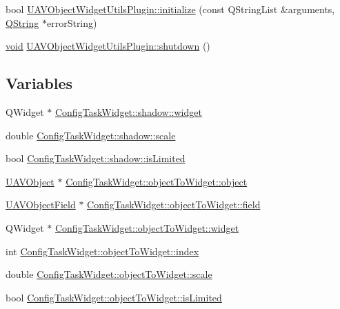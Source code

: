 \begin{DoxyCompactItemize}
\item 
bool \hyperlink{group___u_a_v_object_widget_utils_ga7a913580e5284f9291cab68f3bfed4a3}{\-U\-A\-V\-Object\-Widget\-Utils\-Plugin\-::initialize} (const \-Q\-String\-List \&arguments, \hyperlink{group___u_a_v_objects_plugin_gab9d252f49c333c94a72f97ce3105a32d}{\-Q\-String} $\ast$error\-String)
\item 
\hyperlink{group___u_a_v_objects_plugin_ga444cf2ff3f0ecbe028adce838d373f5c}{void} \hyperlink{group___u_a_v_object_widget_utils_ga672bbb620f7be71610e6adc36d5ca0b9}{\-U\-A\-V\-Object\-Widget\-Utils\-Plugin\-::shutdown} ()
\end{DoxyCompactItemize}
\subsection*{\-Variables}
\begin{DoxyCompactItemize}
\item 
\-Q\-Widget $\ast$ \hyperlink{group___u_a_v_object_widget_utils_ga06fc48ad3875446139f13fbb5b85cdcf}{\-Config\-Task\-Widget\-::shadow\-::widget}
\item 
double \hyperlink{group___u_a_v_object_widget_utils_ga06ad87fdaa5af70d7239dda785c76f76}{\-Config\-Task\-Widget\-::shadow\-::scale}
\item 
bool \hyperlink{group___u_a_v_object_widget_utils_ga712acd84a5850623406835776b1840b4}{\-Config\-Task\-Widget\-::shadow\-::is\-Limited}
\item 
\hyperlink{class_u_a_v_object}{\-U\-A\-V\-Object} $\ast$ \hyperlink{group___u_a_v_object_widget_utils_ga0a7a2adb310cdc6b0301dfad762a4f30}{\-Config\-Task\-Widget\-::object\-To\-Widget\-::object}
\item 
\hyperlink{class_u_a_v_object_field}{\-U\-A\-V\-Object\-Field} $\ast$ \hyperlink{group___u_a_v_object_widget_utils_ga36fdb22e759e0beae23ae99b03becb68}{\-Config\-Task\-Widget\-::object\-To\-Widget\-::field}
\item 
\-Q\-Widget $\ast$ \hyperlink{group___u_a_v_object_widget_utils_gac3c3016bdfda2c16ec8e356dd1a0882d}{\-Config\-Task\-Widget\-::object\-To\-Widget\-::widget}
\item 
int \hyperlink{group___u_a_v_object_widget_utils_ga32127d63078e835a69c50d20ea1a678b}{\-Config\-Task\-Widget\-::object\-To\-Widget\-::index}
\item 
double \hyperlink{group___u_a_v_object_widget_utils_ga7981e8bb575a90d2a1491fd792108efe}{\-Config\-Task\-Widget\-::object\-To\-Widget\-::scale}
\item 
bool \hyperlink{group___u_a_v_object_widget_utils_ga22163ec4275b9b06770d4caead750ee4}{\-Config\-Task\-Widget\-::object\-To\-Widget\-::is\-Limited}

\end{DoxyCompactItemize}
